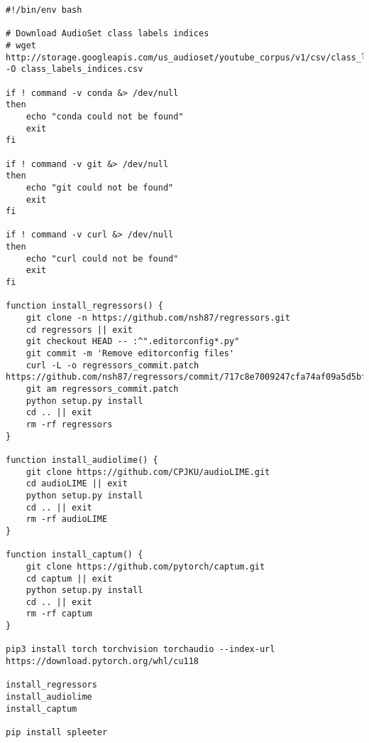 \documentclass[
    bindingoffset=5mm,  %
    footnoteindent=3mm, %
    hyphenation=true    %
]{src/wut-thesis}
\begin{document}
\pagestyle{plain}

\listoffigurestoc    %
\vspace{1cm}         %
\listoftablestoc     %
\vspace{1cm}         %
\listofappendicestoc %


\captionsetup[figure]{list=no}
\captionsetup[table]{list=no}

\clearpage
{} \label{appendix:InstallationScriptListing}
\begin{verbatim}
#!/bin/env bash

# Download AudioSet class labels indices
# wget http://storage.googleapis.com/us_audioset/youtube_corpus/v1/csv/class_labels_indices.csv -O class_labels_indices.csv

if ! command -v conda &> /dev/null
then
    echo "conda could not be found"
    exit
fi

if ! command -v git &> /dev/null
then
    echo "git could not be found"
    exit
fi

if ! command -v curl &> /dev/null
then
    echo "curl could not be found"
    exit
fi

function install_regressors() {
    git clone -n https://github.com/nsh87/regressors.git
    cd regressors || exit
    git checkout HEAD -- :^".editorconfig*.py"
    git commit -m 'Remove editorconfig files'
    curl -L -o regressors_commit.patch https://github.com/nsh87/regressors/commit/717c8e7009247cfa74af09a5d5bfc592752c04ae.patch
    git am regressors_commit.patch
    python setup.py install
    cd .. || exit
    rm -rf regressors
}

function install_audiolime() {
    git clone https://github.com/CPJKU/audioLIME.git
    cd audioLIME || exit
    python setup.py install
    cd .. || exit
    rm -rf audioLIME
}

function install_captum() {
    git clone https://github.com/pytorch/captum.git
    cd captum || exit
    python setup.py install
    cd .. || exit
    rm -rf captum
}

pip3 install torch torchvision torchaudio --index-url https://download.pytorch.org/whl/cu118

install_regressors
install_audiolime
install_captum

pip install spleeter
\end{verbatim}
\end{document}
